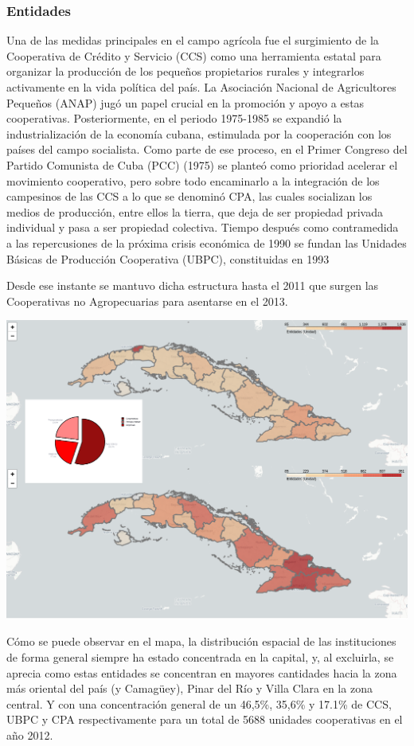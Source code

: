\documentclass{article}
\begin{document}
\subsubsection{Entidades}
Una de las medidas principales en el campo agrícola fue el surgimiento de la Cooperativa de Crédito y Servicio (CCS) como una herramienta estatal para organizar la producción de los pequeños propietarios rurales y integrarlos activamente en la vida política 
del país. La Asociación Nacional de Agricultores Pequeños (ANAP) jugó un papel crucial en la promoción y apoyo a estas cooperativas. Posteriormente, en el periodo 1975-1985 se expandió la industrialización de la economía cubana, estimulada por la cooperación 
con los países del campo socialista. Como parte de ese proceso, en el Primer Congreso del Partido Comunista de Cuba (PCC) (1975) se planteó como prioridad acelerar el movimiento cooperativo, pero sobre todo encaminarlo a la integración de los campesinos de las 
CCS a lo que se denominó CPA, las cuales socializan los medios de producción, entre ellos la tierra, que deja de ser propiedad privada individual y pasa a ser propiedad colectiva. Tiempo después como contramedida a las repercusiones de la próxima crisis económica de 
1990 se fundan las Unidades Básicas de Producción Cooperativa (UBPC), constituidas en 1993

\clearpage
Desde ese instante se mantuvo dicha estructura hasta el 2011 que surgen las Cooperativas no Agropecuarias para asentarse en el 2013.
\begin{center}
    \includegraphics[width=1.0\textwidth]{img/mapa.png}
\end{center}
Cómo se puede observar en el mapa, la distribución espacial de las instituciones de forma general siempre ha estado concentrada en la capital, y, al excluirla, se aprecia como estas entidades se concentran en mayores cantidades hacia la zona más oriental del país (y Camagüey),
Pinar del Río y Villa Clara en la zona central. Y con una concentración general de un 46,5\%, 35,6\% y 17.1\% de CCS, UBPC y CPA respectivamente para un total de 5688 unidades cooperativas en el año 2012.\\\\
\end{document}
